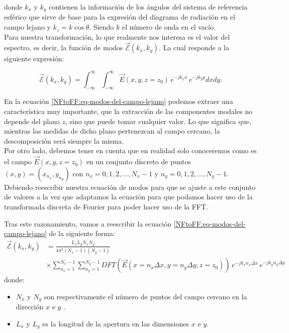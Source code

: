\noindent
donde $k_{x}$ y $ k_{y}$  contienen la información de los ángulos del sistema de referencia esférico que sirve de base para la expresión del diagrama de radiación en el campo lejano y  $k_{z}=k\cos\theta$. Siendo $k$ el número de onda en el vacío.\\

Para nuestra transformación, lo que realmente nos interesa es el valor del espectro, es decir, la función de modos ${\vec{\mathcal{E}}}(k_{x},k_{y})$. La cual responde a la siguiente expresión:

\begin{equation}
{\vec{\mathcal{E}}}(k_{x},k_{y})=\int_{-\infty}^{\infty}\int_{-\infty}^{\infty}\vec{E}(x,y,z=z_{0})\,e^{-j k_{x}x}\,e^{-jk_{y}y} dx dy.
\label{NFtoFF:eq-modos-del-campo-lejano}
\end{equation}
 
En la ecuación \eqref{NFtoFF:eq-modos-del-campo-lejano} podemos extraer una característica muy importante,  que la extracción de las componentes modales no depende del plano $z$, sino que puede tomar cualquier valor. Lo que significa que, mientras las medidas de dicho plano pertenezcan al campo cercano, la descomposición será siempre la misma.\\
Por otro lado, debemos tener en cuenta que en realidad solo conoceremos como es el campo  $\vec{E}(x,y,z=z_{0})$ en un conjunto discreto de puntos $(x,y) = (x_{n_{x}},y_{n_{y}})$ con  $n_{x}=0,1,2,\ldots,N_{x}-1$ y  $n_{y}=0,1,2,\ldots,N_{y}-1$. Debiendo reescribir nuestra ecuación de modos para que se ajuste a este conjunto de valores a la vez que adaptamos la ecuación para que podamos hacer uso de la transformada discreta de Fourier para poder hacer uso de la FFT.

Tras este razonamiento, vamos a reescribir la ecuación \eqref{NFtoFF:eq-modos-del-campo-lejano} de la siguiente forma: 
\begin{align}
{\vec{\mathcal{E}}}(k_{x},k_{y})&=\frac{L_{x}L_{y}N_{x}N_{y}}{4 \pi^2 (N_{x}-1)(N_{y}-1)} \nonumber \\
&\times \sum_{n_{x}=1}^{N_{x}-1}\sum_{n_{y}=1}^{N_{y}-1} DFT(\vec{E}(x=n_{x}\Delta
x,y=n_{y}\Delta
y,z=z_{0}))\,e^{-j k_{x}n_{x} \Delta x}\,e^{-jk_{y}n_{y} \Delta y}
\label{NFtoFF:eq-fourier}
\end{align}
\noindent
donde:

\begin{itemize}
    \item $N_{x}$ y $N_{y}$ son respectivamente el número de puntos del campo cercano en la dirección $x$ e $y$ .
    \item $L_{x}$ y $L_{y}$  es la longitud de la apertura en las dimensiones  $x$ e $y$.
\end{itemize}

